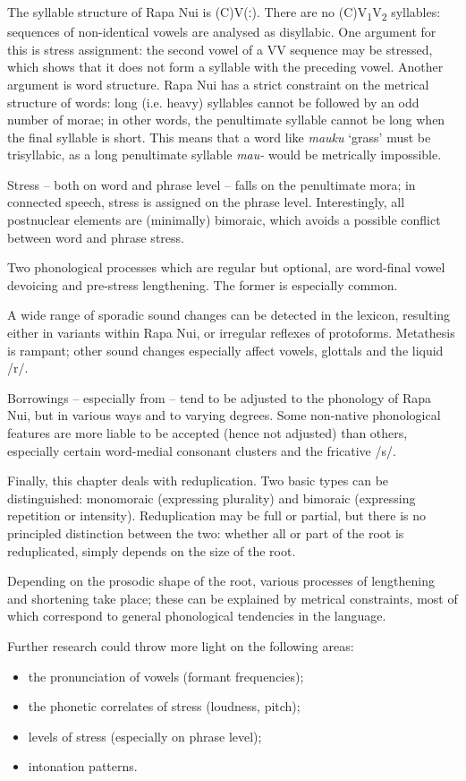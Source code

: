The syllable structure of Rapa Nui is (C)V(ː). There are no (C)V\textsubscript{1}V\textsubscript{2} syllables: sequences of non-identical vowels are analysed as disyllabic. One argument for this is stress assignment: the second vowel of a VV sequence may be stressed, which shows that it does not form a syllable with the preceding vowel. Another argument is word structure. Rapa Nui has a strict constraint on the metrical structure of words: long (i.e. heavy) syllables cannot be followed by an odd number of morae; in other words, the penultimate syllable cannot be long when the final syllable is short. This means that a word like \textit{mauku} ‘grass’ must be trisyllabic, as a long penultimate syllable \textit{mau-} would be metrically impossible.

Stress – both on word and phrase level – falls on the penultimate mora; in connected speech, stress is assigned on the phrase level. Interestingly, all postnuclear elements are (minimally) bimoraic, which avoids a possible conflict between word and phrase stress.

Two phonological processes which are regular but optional, are word-final vowel devoicing and pre-stress lengthening. The former is especially common.

A wide range of sporadic sound changes can be detected in the lexicon, resulting either in variants within Rapa Nui, or irregular reflexes of protoforms. Metathesis is rampant; other sound changes especially affect vowels, glottals and the liquid /r/.

Borrowings – especially from  – tend to be adjusted to the phonology of Rapa Nui, but in various ways and to varying degrees. Some non-native phonological features are more liable to be accepted (hence not adjusted) than others, especially certain word-medial consonant clusters and the fricative /s/.

Finally, this chapter deals with reduplication. Two basic types can be distinguished: monomoraic (expressing plurality) and bimoraic (expressing repetition or intensity). Re\-du\-plication may be full or partial, but there is no principled distinction between the two: whether all or part of the root is reduplicated, simply depends on the size of the root.

Depending on the prosodic shape of the root, various processes of lengthening and shortening take place; these can be explained by metrical constraints, most of which correspond to general phonological tendencies in the language.

\newpage 
Further research could throw more light on the following areas:

\begin{itemize}
\item 
the pronunciation of vowels (formant frequencies);

\item 
the phonetic correlates of stress (loudness, pitch);

\item 
levels of stress (especially on phrase level);

\item 
intonation patterns.

\end{itemize}
